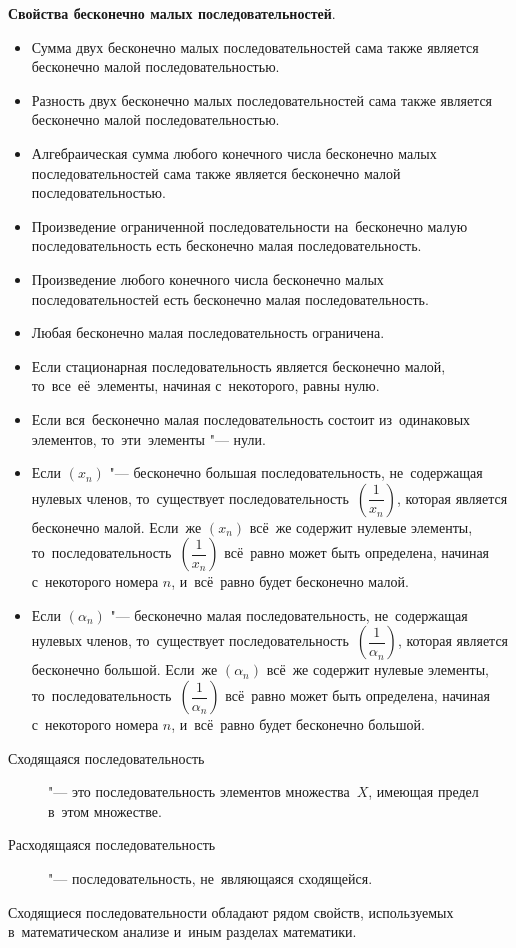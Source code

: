\documentclass[]{scrartcl}
\begin{document}
\textbf{Свойства бесконечно малых последовательностей}.
\begin{itemize}
	\item Сумма двух бесконечно малых последовательностей сама также является бесконечно малой последовательностью.
	\item Разность двух бесконечно малых последовательностей сама также является бесконечно малой последовательностью.
	\item Алгебраическая сумма любого конечного числа бесконечно малых последовательностей сама также является бесконечно малой последовательностью.
	\item Произведение ограниченной последовательности на~бесконечно малую последовательность есть бесконечно малая последовательность.
	\item Произведение любого конечного числа бесконечно малых последовательностей есть бесконечно малая последовательность.
	\item Любая бесконечно малая последовательность ограничена.
	\item Если стационарная последовательность является бесконечно малой, то~все~её~элементы, начиная с~некоторого, равны нулю.
	\item Если вся~бесконечно малая последовательность состоит из~одинаковых элементов, то~эти~элементы "--- нули.
	\item Если ${\textstyle (x_{n})}$ "--- бесконечно большая последовательность, не~содержащая нулевых членов, то~существует последовательность~${\textstyle (\dfrac{1}{x_n})}$, которая является бесконечно малой. Если~же ${\textstyle (x_{n})}$ всё~же содержит нулевые элементы, то~последовательность~${\textstyle (\dfrac{1}{x_n})}$ всё~равно может быть определена, начиная с~некоторого номера ${\textstyle n}$, и~всё~равно будет бесконечно малой.
	\item Если ${\textstyle (\alpha_{n})}$ "--- бесконечно малая последовательность, не~содержащая нулевых членов, то~существует последовательность~${\textstyle (\dfrac{1}{\alpha_n})}$, которая является бесконечно большой. Если~же ${\textstyle (\alpha_{n})}$ всё~же содержит нулевые элементы, то~последовательность~${\textstyle (\dfrac{1}{\alpha_n})}$ всё~равно может быть определена, начиная с~некоторого номера ${\textstyle n}$, и~всё~равно будет бесконечно большой.
\end{itemize}

\begin{description}
	\item[Сходящаяся последовательность] "--- это последовательность элементов множества~${\textstyle X}$, имеющая предел в~этом множестве.
	\item[Расходящаяся последовательность] "--- последовательность, не~являющаяся сходящейся.
\end{description}
Сходящиеся последовательности обладают рядом свойств, используемых в~математическом анализе и~иным разделах математики.
\end{document}
